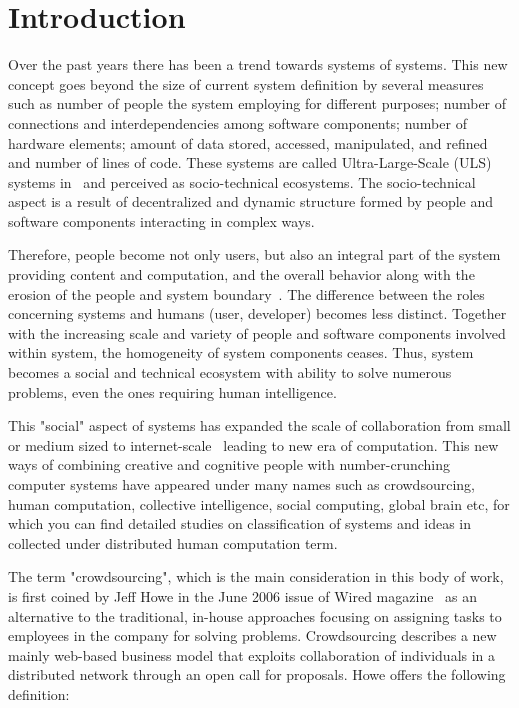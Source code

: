 \chapter{Introduction} 


Over the past years there has been a trend towards systems of systems. This new concept
goes beyond the size of current system definition by several measures such as number of people
the system employing for different purposes; number of connections and interdependencies 
among software components; number of hardware elements; amount of data stored, accessed, 
manipulated, and refined and number of lines of code. These systems are called 
Ultra-Large-Scale (ULS) systems in~\cite{ULSReport} and perceived as socio-technical 
ecosystems. The socio-technical aspect is a result of decentralized and dynamic structure
formed by people and software components interacting in complex ways.

Therefore, people become not only users, but also an integral part of the system providing 
content and computation, and the overall behavior along with the erosion of the people and 
system boundary~\cite{ULSReport}. The difference between the roles concerning systems 
and humans (user, developer) becomes less distinct. Together with the increasing scale 
and variety of people and software components involved within system, the homogeneity 
of system components ceases. Thus, system becomes a social and technical ecosystem 
with ability to solve numerous problems, even the ones requiring human intelligence.

This "social" aspect of systems has expanded the scale of collaboration from small or 
medium sized to internet-scale~\cite{Dorn2012b} leading to new era of computation. 
This new ways of combining creative and cognitive people with number-crunching 
computer systems have appeared under many names such as crowdsourcing, 
human computation, collective intelligence, social computing, global brain etc, 
for which you can find detailed studies on classification of systems and ideas 
in~\cite{Quinn2009, Quinn2011} collected under distributed human computation term.

The term "crowdsourcing", which is the main consideration in this body of work, 
is first coined by Jeff Howe in the June 2006 issue of Wired magazine~\cite{Howe2006b} 
as an alternative to the traditional, in-house approaches focusing on assigning tasks 
to employees in the company for solving problems. Crowdsourcing describes a new 
mainly web-based business model that exploits collaboration of individuals in a 
distributed network through an open call for proposals. Howe offers the following definition:

